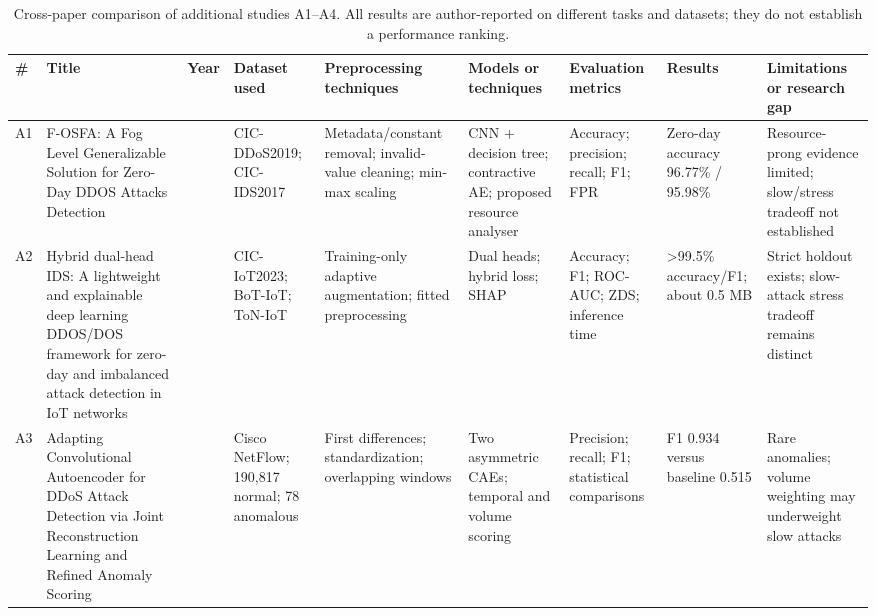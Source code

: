\documentclass[conference]{IEEEtran}
\begin{document}
\begin{table}[!t]
\caption{Cross-paper comparison of additional studies A1--A4. All results are author-reported on different tasks and datasets; they do not establish a performance ranking.}
\label{tab:review1}
\centering\footnotesize\setlength{\tabcolsep}{2.2pt}\renewcommand{\arraystretch}{1.12}
\begin{tabular}{@{}>{\raggedright\arraybackslash}p{}>{\raggedright\arraybackslash}p{}>{\raggedright\arraybackslash}p{}>{\raggedright\arraybackslash}p{}>{\raggedright\arraybackslash}p{}>{\raggedright\arraybackslash}p{}>{\raggedright\arraybackslash}p{}>{\raggedright\arraybackslash}p{}>{\raggedright\arraybackslash}p{}@{}}\toprule
\textbf{\#} & \textbf{Title} & \textbf{Year} & \textbf{Dataset used} & \textbf{Preprocessing techniques} & \textbf{Models or techniques} & \textbf{Evaluation metrics} & \textbf{Results} & \textbf{Limitations or research gap}\\\midrule
A1 & F-OSFA: A Fog Level Generalizable Solution for Zero-Day DDOS Attacks Detection \cite{ref4} & 2025 & CIC-DDoS2019; CIC-IDS2017 & Metadata/constant removal; invalid-value cleaning; min-max scaling & CNN + decision tree; contractive AE; proposed resource analyser & Accuracy; precision; recall; F1; FPR & Zero-day accuracy 96.77\% / 95.98\% & Resource-prong evidence limited; slow/stress tradeoff not established\\
\addlinespace[4pt]
A2 & Hybrid dual-head IDS: A lightweight and explainable deep learning DDOS/DOS framework for zero-day and imbalanced attack detection in IoT networks \cite{ref5} & 2026 & CIC-IoT2023; BoT-IoT; ToN-IoT & Training-only adaptive augmentation; fitted preprocessing & Dual heads; hybrid loss; SHAP & Accuracy; F1; ROC-AUC; ZDS; inference time & >99.5\% accuracy/F1; about 0.5 MB & Strict holdout exists; slow-attack stress tradeoff remains distinct\\
\addlinespace[4pt]
A3 & Adapting Convolutional Autoencoder for DDoS Attack Detection via Joint Reconstruction Learning and Refined Anomaly Scoring \cite{ref6} & 2025 & Cisco NetFlow; 190,817 normal; 78 anomalous & First differences; standardization; overlapping windows & Two asymmetric CAEs; temporal and volume scoring & Precision; recall; F1; statistical comparisons & F1 0.934 versus baseline 0.515 & Rare anomalies; volume weighting may underweight slow attacks\\

\end{tabular}
\end{table}
\end{document}
